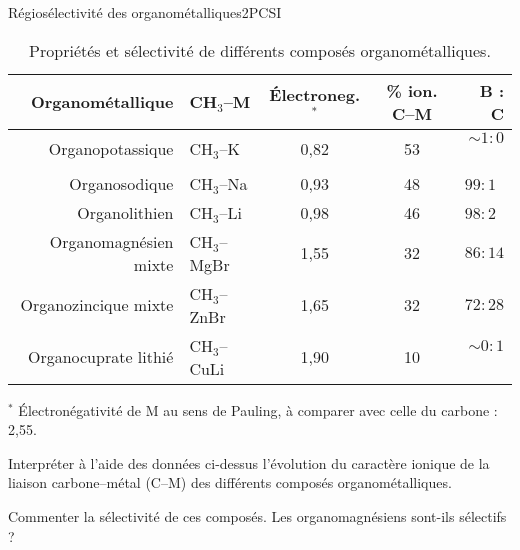 \begin{exercise}{Régiosélectivité des organométalliques}{2}{PCSI}
\begin{questions}
\begin{EnvUplevel}
\begin{table}[H]
    \centering
    \begin{tabular}{rlccr}
        Organométallique & CH$_3$--M & \'Electroneg.$^\ast$ & \% ion. C--M & \textbf{B} : \textbf{C} \\ \hline\hline
        Organopotassique      & CH$_3$--K    & 0,82 & 53 & $\sim 1:0$~ \\
        Organosodique         & CH$_3$--Na   & 0,93 & 48 & $99:1$~ \\
        Organolithien         & CH$_3$--Li   & 0,98 & 46 & $98:2$~ \\
        Organomagnésien mixte & CH$_3$--MgBr & 1,55 & 32 & $86:14$ \\
        Organozincique mixte  & CH$_3$--ZnBr & 1,65 & 32 & $72:28$ \\
        Organocuprate lithié  & CH$_3$--CuLi & 1,90 & 10 & $\sim 0:1$~ \\ \hline
    \end{tabular}
    \begin{flushleft}
        \small $^\ast$ \'Electronégativité de M au sens de Pauling, à comparer avec celle du carbone : 2,55.
    \end{flushleft}
    \caption{Propriétés et sélectivité de différents composés organométalliques.}
\end{table}
\end{EnvUplevel}

\question Interpréter à l'aide des données ci-dessus l'évolution du caractère ionique de la liaison carbone--métal (C--M) des différents composés organométalliques.

\question Commenter la sélectivité de ces composés. Les organomagnésiens sont-ils sélectifs ?


\end{questions}
\end{exercise}